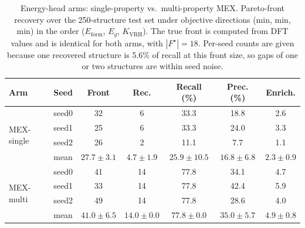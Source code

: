 \begin{table}[htbp]
\renewcommand{\arraystretch}{1.2}
\setlength{\tabcolsep}{4pt}
\caption{Energy-head arms: single-property vs.\ multi-property MEX. Pareto-front recovery over the 250-structure test set under objective directions (min, min, min) in the order ($E_\mathrm{form}$, $E_g$, $K_\mathrm{VRH}$). The true front is computed from DFT values and is identical for both arms, with $|F^\star|{=}18$. Per-seed counts are given because one recovered structure is 5.6\% of recall at this front size, so gaps of one or two structures are within seed noise.}
\label{tab:pareto_arms_mex}
\centering
\footnotesize
\begin{tabular}{@{}llccccc@{}}
\hline\hline
\textbf{Arm} & \textbf{Seed} & \textbf{Front} & \textbf{Rec.} & \textbf{Recall (\%)} & \textbf{Prec. (\%)} & \textbf{Enrich.} \\
\hline
\multirow{4}{*}{MEX-single}
  & seed0 & 32 & 6 & 33.3 & 18.8 & 2.6 \\
  & seed1 & 25 & 6 & 33.3 & 24.0 & 3.3 \\
  & seed2 & 26 & 2 & 11.1 & 7.7 & 1.1 \\
  & mean & $27.7 \pm 3.1$ & $4.7 \pm 1.9$ & $25.9 \pm 10.5$ & $16.8 \pm 6.8$ & $2.3 \pm 0.9$ \\
\hline
\multirow{4}{*}{MEX-multi}
  & seed0 & 41 & 14 & 77.8 & 34.1 & 4.7 \\
  & seed1 & 33 & 14 & 77.8 & 42.4 & 5.9 \\
  & seed2 & 49 & 14 & 77.8 & 28.6 & 4.0 \\
  & mean & $41.0 \pm 6.5$ & $14.0 \pm 0.0$ & $77.8 \pm 0.0$ & $35.0 \pm 5.7$ & $4.9 \pm 0.8$ \\
\hline\hline
\end{tabular}
\end{table}
